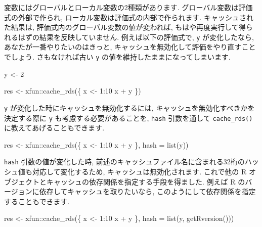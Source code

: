 \documentclass[
  11pt,
  lualatex,ja=standard,jafont=noto]{bxjsreport}
\newenvironment{Shaded}{\begin{snugshade}}{\end{snugshade}}
\newcommand{\AttributeTok}[1]{\textcolor[rgb]{0.77,0.63,0.00}{#1}}
\newcommand{\DecValTok}[1]{\textcolor[rgb]{0.00,0.00,0.81}{#1}}
\newcommand{\FunctionTok}[1]{\textcolor[rgb]{0.00,0.00,0.00}{#1}}
\newcommand{\NormalTok}[1]{#1}
\newcommand{\OtherTok}[1]{\textcolor[rgb]{0.56,0.35,0.01}{#1}}
\newcommand{\SpecialCharTok}[1]{\textcolor[rgb]{0.00,0.00,0.00}{#1}}
\begin{document}
変数にはグローバルとローカル変数の2種類があります. グローバル変数は評価式の外部で作られ, ローカル変数は評価式の内部で作られます. キャッシュされた結果は, 評価式内のグローバル変数の値が変われば, もはや再度実行して得られるはずの結果を反映していません. 例えば以下の評価式で, \texttt{y} が変化したなら, あなたが一番やりたいのはきっと, キャッシュを無効化して評価をやり直すことでしょう. さもなければ古い \texttt{y} の値を維持したままになってしまいます.

\begin{Shaded}
\begin{Highlighting}[]
\NormalTok{y }\OtherTok{\textless{}{-}} \DecValTok{2}

\NormalTok{res }\OtherTok{\textless{}{-}}\NormalTok{ xfun}\SpecialCharTok{::}\FunctionTok{cache\_rds}\NormalTok{(\{}
\NormalTok{  x }\OtherTok{\textless{}{-}} \DecValTok{1}\SpecialCharTok{:}\DecValTok{10}
\NormalTok{  x }\SpecialCharTok{+}\NormalTok{ y}
\NormalTok{\})}
\end{Highlighting}
\end{Shaded}

\texttt{y} が変化した時にキャッシュを無効化するには, キャッシュを無効化すべきかを決定する際に \texttt{y} も考慮する必要があることを, \texttt{hash} 引数を通して \texttt{cache\_rds()} に教えてあげることもできます.

\begin{Shaded}
\begin{Highlighting}[]
\NormalTok{res }\OtherTok{\textless{}{-}}\NormalTok{ xfun}\SpecialCharTok{::}\FunctionTok{cache\_rds}\NormalTok{(\{}
\NormalTok{  x }\OtherTok{\textless{}{-}} \DecValTok{1}\SpecialCharTok{:}\DecValTok{10}
\NormalTok{  x }\SpecialCharTok{+}\NormalTok{ y}
\NormalTok{\}, }\AttributeTok{hash =} \FunctionTok{list}\NormalTok{(y))}
\end{Highlighting}
\end{Shaded}

\texttt{hash} 引数の値が変化した時, 前述のキャッシュファイル名に含まれる32桁のハッシュ値も対応して変化するため, キャッシュは無効化されます. これで他の R オブジェクトとキャッシュの依存関係を指定する手段を得ました. 例えば R のバージョンに依存してキャッシュを取りたいなら, このようにして依存関係を指定することもできます.

\begin{Shaded}
\begin{Highlighting}[]
\NormalTok{res }\OtherTok{\textless{}{-}}\NormalTok{ xfun}\SpecialCharTok{::}\FunctionTok{cache\_rds}\NormalTok{(\{}
\NormalTok{  x }\OtherTok{\textless{}{-}} \DecValTok{1}\SpecialCharTok{:}\DecValTok{10}
\NormalTok{  x }\SpecialCharTok{+}\NormalTok{ y}
\NormalTok{\}, }\AttributeTok{hash =} \FunctionTok{list}\NormalTok{(y, }\FunctionTok{getRversion}\NormalTok{()))}
\end{Highlighting}
\end{Shaded}
\end{document}
